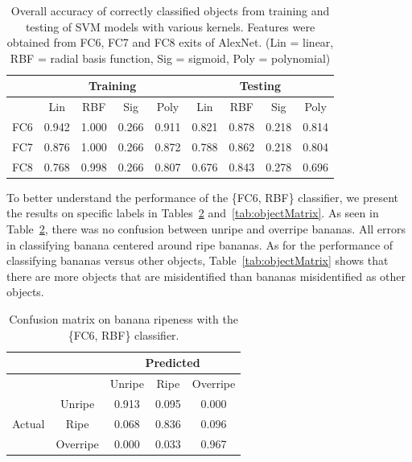 \documentclass{article} %
\begin{document}
\begin{table}[h]
\caption{Overall accuracy of correctly classified objects from training and testing of SVM models with various kernels. Features were obtained from FC6, FC7 and FC8 exits of AlexNet. (Lin = linear, RBF = radial basis function, Sig = sigmoid, Poly = polynomial)}
\label{tab:core}
\centering
\begin{tabular}{|c|c|c|c|c|c|c|c|c|}\hline
 &  \multicolumn{4}{c|}{Training} & \multicolumn{4}{c|}{Testing}\\\hline
&Lin& RBF&Sig&Poly&Lin& RBF&Sig&Poly\\\hline
FC6&0.942&\cellcolor{SFUred!25}1.000&0.266&0.911&0.821&\cellcolor{SFUred!25}0.878&0.218&0.814\\\hline
FC7&0.876&\cellcolor{SFUred!25}1.000&0.266&0.872&0.788&0.862&0.218&0.804\\\hline
FC8&0.768&0.998&0.266&0.807&0.676&0.843&0.278&0.696\\\hline
\end{tabular}
\end{table}

To better understand the performance of the \{FC6, RBF\} classifier, we present the results on specific labels in Tables~\ref{tab:ripenessMatrix} and~\ref{tab:objectMatrix}. As seen in Table~\ref{tab:ripenessMatrix}, there was no confusion between unripe and overripe bananas. All errors in classifying banana centered around ripe bananas. As for the performance of classifying bananas versus other objects, Table~\ref{tab:objectMatrix} shows that there are more objects that are misidentified than bananas misidentified as other objects. 


	
\begin{table}[h]
\centering
\caption{Confusion matrix on banana ripeness with the \{FC6, RBF\} classifier. }
\label{tab:ripenessMatrix}
\begin{tabular}{|c|c|c|c|c|}\hline
&&\multicolumn{3}{c|}{Predicted}\\\hline
&&Unripe&Ripe&Overripe\\\hline
\multirow{3}{*}{Actual}&Unripe&\cellcolor{SFUred!65}0.913&\cellcolor{SFUred!15}0.095&0.000\\\cline{2-5}
&Ripe&\cellcolor{SFUred!15}0.068&\cellcolor{SFUred!65}0.836&\cellcolor{SFUred!15}0.096\\\cline{2-5}
&Overripe&0.000&\cellcolor{SFUred!15}0.033&\cellcolor{SFUred!65}0.967\\\hline
\end{tabular}
\end{table}
\end{document}
